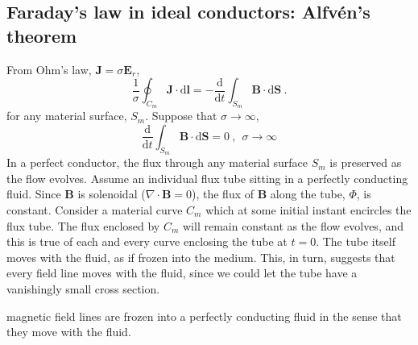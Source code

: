 \documentclass[12pt,a4paper]{article}
\renewcommand{\vec}[1]{\boldsymbol{#1}}
\newcommand{\dif}{\mathrm{d}}
\newcounter{theo}[section]\setcounter{theo}{0}
\begin{document}
\subsection{Faraday's law in ideal conductors: Alfv\'en's theorem}
From Ohm's law, $\vec{J} = \sigma \vec{E}_r$, 
\begin{equation}
\frac{1}{\sigma} \oint_{C_m} \vec{J}\cdot \dif \vec{l} = -\frac{\dif }{\dif t} \int_{S_m} \vec{B} \cdot \dif \vec{S} ~.
\end{equation}
for any material surface, $S_m$. Suppose that $\sigma \rightarrow \infty$,
\begin{equation}
\frac{\dif }{\dif t} \int_{S_m} \vec{B} \cdot \dif \vec{S} = 0 ~, ~~ \sigma \rightarrow \infty
\end{equation}
In a perfect conductor, the flux through any material surface $S_m$ is preserved as the flow evolves. Assume an individual flux tube sitting in a perfectly conducting fluid. Since $\vec{B}$ is solenoidal ($\nabla \cdot \vec{B} = 0$), the flux of $\vec{B}$ along the tube, $\Phi$, is constant. Consider a material curve $C_m$ which at some initial instant encircles the flux tube. The flux enclosed by $C_m$ will remain constant as the flow evolves, and this is true of each and every curve enclosing the tube at $t = 0$. The tube itself moves with the fluid, as if frozen into the medium. This, in turn, suggests that every field line moves with the fluid, since we could let the tube have a vanishingly small cross section. 
\begin{tcolorbox}[colback=green!5,colframe=green!40!black,title=Alfv\'en's theorem]
magnetic field lines are frozen into a perfectly conducting fluid in the sense that they move with the fluid.
\end{tcolorbox}



































































\end{document}
